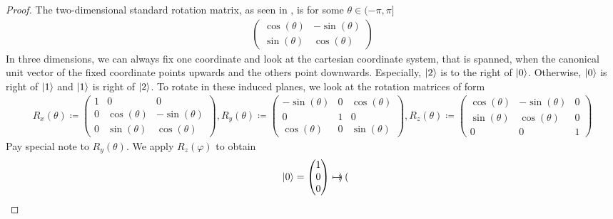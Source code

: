 \begin{proof}
    The two-dimensional standard rotation matrix, as seen in , is for some \(\theta \in (-\pi, \pi]\)
    \begin{align}
        \begin{pmatrix}
            \cos(\theta) & -\sin(\theta)\\
            \sin(\theta) &  \cos(\theta)
        \end{pmatrix}
    \end{align}
    In three dimensions, we can always fix one coordinate and look at the cartesian coordinate system, that is spanned, when the canonical unit vector of the fixed coordinate points upwards and the others point downwards. Especially, \(\ket{2}\) is to the right of \(\ket{0}\). Otherwise, \(\ket{0}\) is right of \(\ket{1}\) and \(\ket{1}\) is right of \(\ket{2}\). To rotate in these induced planes, we look at the rotation matrices of form
    \begin{align}
        R_x(\theta) \coloneqq \begin{pmatrix}
                       1 &             0 &             0\\
                       0 &  \cos(\theta) & -\sin(\theta)\\
                       0 &  \sin(\theta) &  \cos(\theta)
        \end{pmatrix},
        R_y(\theta) \coloneqq \begin{pmatrix}
            -\sin(\theta) &             0 & \cos(\theta)\\
                        0 &             1 &            0\\
             \cos(\theta) &             0 & \sin(\theta)
        \end{pmatrix},
        R_z(\theta) \coloneqq \begin{pmatrix}
            \cos(\theta) & -\sin(\theta) & 0\\
            \sin(\theta) &  \cos(\theta) & 0\\
                       0 &             0 & 1
        \end{pmatrix}
    \end{align}
    Pay special note to \(R_y(\theta)\). We apply \(R_z(\varphi)\) to obtain
    \begin{align}
        \ket{0} = \begin{pmatrix}
            1\\
            0\\
            0
        \end{pmatrix} \mapsto \begin{pmatrix}

\end{pmatrix}
\end{align}
\end{proof}
